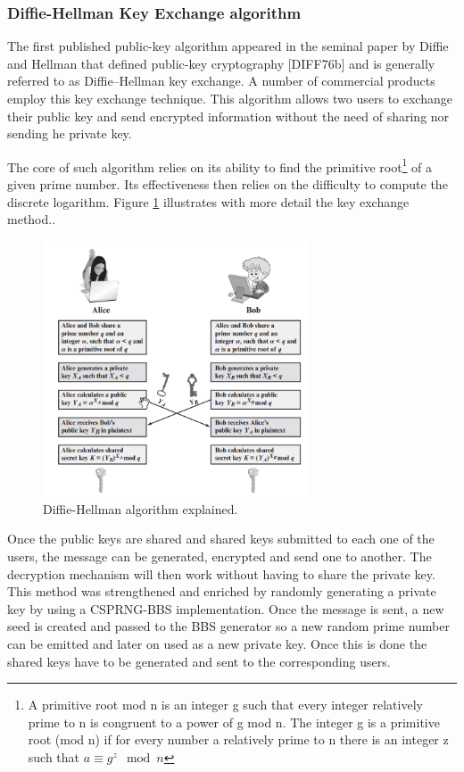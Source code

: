 \documentclass[letterpaper,12pt]{article}
\begin{document}
\subsubsection{Diffie-Hellman Key Exchange algorithm}
The first published public-key algorithm appeared in the seminal paper by Diffie
and Hellman that defined public-key cryptography [DIFF76b] and is generally referred to as Diffie–Hellman key exchange. A number of commercial products employ this key exchange technique\cite{WS2017-SDES}. This algorithm allows two users to exchange their public key and send encrypted information without the need of sharing nor sending he private key.

The core of such algorithm relies on its ability to find the primitive root\footnote{A primitive root mod n is an integer g such that every integer relatively prime to n is congruent to a power of g mod n. The integer g is a primitive root (mod n) if for every number a relatively prime to n there is an integer z such that  $a \equiv g^z \mod n$} of a given prime number. Its effectiveness then relies on the difficulty to compute the discrete logarithm. Figure \ref{fig:DH} illustrates with more detail the key exchange method..

\begin{figure}[H]
    \centering
    \includegraphics[width=0.7\textwidth]{assets/diffie_hellman.png}
    \caption{Diffie-Hellman algorithm explained.\cite{WS2017-SDES}}
    \label{fig:DH}
\end{figure}

Once the public keys are shared and shared keys submitted to each one of the users, the message can be generated, encrypted and send one to another. The decryption mechanism will then work without having to share the private key. This method was strengthened and enriched by randomly generating a private key by using a CSPRNG-BBS implementation. Once the message is sent, a new seed is created and passed to the BBS generator so a new random prime number can be emitted and later on used as a new private key. Once this is done the shared keys have to be generated and sent to the corresponding users.
\end{document}
